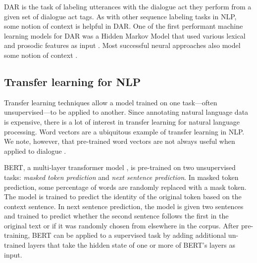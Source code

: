 \documentclass[11pt,a4paper]{article}
\begin{document}
DAR is the task of labeling utterances with the dialogue act they perform 
from a given set of dialogue act tags.
As with other sequence labeling tasks in NLP, some notion of context is helpful in DAR.
One of the first performant machine learning models for DAR was a Hidden Markov Model 
that used various lexical and prosodic features as input \citep{stolckeDialogueActModeling2000}.
Most successful neural approaches also model some notion of context \citep[e.g.,][]{kalchbrennerRecurrentConvolutionalNeural2013,tranHierarchicalNeuralModel2017,botheContextbasedApproachDialogue2018,bothe2018conversational,zhao2018unified}.

\subsection{Transfer learning for NLP}
Transfer learning techniques allow a model trained on one task---often unsupervised---to be applied to another. 
Since annotating natural language data is expensive, there is a lot of interest in transfer learning for natural language processing. 
Word vectors \citep[e.g.,][]{mikolovDistributedRepresentationsWords2013,penningtonGloveGlobalVectors2014} are a ubiquitous example of transfer learning in NLP.
We note, however, that pre-trained word vectors are not always useful when applied to dialogue \cite{cerisaraEffectsUsingWord2vec2017}. 

BERT, a multi-layer transformer model \citep{devlinBERTPretrainingDeep2018}, 
is pre-trained on two unsupervised tasks: 
\emph{masked token prediction} and \emph{next sentence prediction}.
In masked token prediction, some percentage of words are randomly replaced with a mask token.
The model is trained to predict the identity of the original token based on the context sentence.
In next sentence prediction, the model is given two sentences and trained to predict whether the second sentence follows the first in the original text or if it was randomly chosen from elsewhere in the corpus.
After pre-training, BERT can be applied to a supervised task by adding additional un-trained layers that take the hidden state of one or more of BERT's layers as input. 
\end{document}

